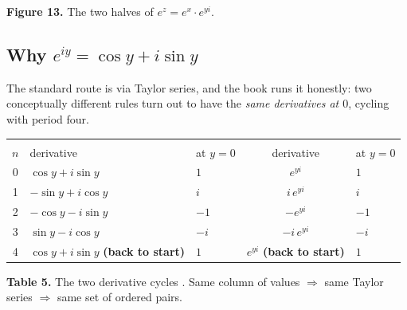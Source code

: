 \vspace{10pt}
\begin{center}\begin{minipage}{0.93\textwidth}\footnotesize\color{slate}
\textbf{Figure 13.}\; The two halves of $e^{z}=e^{x}\cdot e^{yi}$.
\end{minipage}\end{center}

\clearpage
\subsection{Why \texorpdfstring{$e^{iy}=\cos y+i\sin y$}{e\^{}(iy) = cos y + i sin y}}

The standard route is via Taylor series, and the book runs it honestly: two conceptually different
rules turn out to have the \emph{same derivatives at $0$}, cycling with period four.

\begin{center}\small
\begin{tabular}{@{}c >{\raggedright\arraybackslash}p{4.4cm} >{\raggedright\arraybackslash}p{3.6cm} c >{\raggedright\arraybackslash}p{3.3cm}@{}}
\toprule
\rowcolor{csD!12}
& \multicolumn{2}{l}{\textbf{\color{csD}$f(y)=\cos y+i\sin y$}} &
  \multicolumn{2}{l}{\textbf{\color{csD}$f(y)=e^{yi}$}}\\
\rowcolor{csD!12}
$n$ & derivative & at $y=0$ & derivative & at $y=0$\\
\midrule
0 & $\cos y+i\sin y$   & $1$  & $e^{yi}$        & $1$\\
1 & $-\sin y+i\cos y$  & $i$  & $i\,e^{yi}$     & $i$\\
2 & $-\cos y-i\sin y$  & $-1$ & $-e^{yi}$       & $-1$\\
3 & $\sin y-i\cos y$   & $-i$ & $-i\,e^{yi}$    & $-i$\\
\rowcolor{gold!22}
4 & $\cos y+i\sin y$ \;\textbf{(back to start)} & $1$ & $e^{yi}$ \;\textbf{(back to start)} & $1$\\
\bottomrule
\end{tabular}
\end{center}
\vspace{-2pt}
\begin{center}\begin{minipage}{0.93\textwidth}\footnotesize\color{slate}
\textbf{Table 5.}\; The two derivative cycles . Same column of values
$\Rightarrow$ same Taylor series $\Rightarrow$ same set of ordered pairs.
\end{minipage}\end{center}

